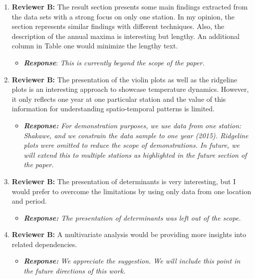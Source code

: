 \documentclass[a4paper, 12pt, conference]{ieeeconf}      %
\begin{document}
\begin{enumerate}
	\item \textbf{Reviewer B:}  The result section presents some main findings extracted from the data sets with a strong focus on only one station. In my opinion, the section represents similar findings with different techniques. Also, the description of the annual maxima is interesting but lengthy.   An additional column in Table one would minimize the lengthy text.
	
		\begin{itemize}
		\item \textbf{\emph{Response}}: \emph{This is currently beyond the scope of the paper.}
	\end{itemize}
	
	 
\item \textbf{Reviewer B:}  The presentation of the violin plots as well as the ridgeline plots is an interesting approach to showcase temperature dynamics. However, it only reflects one year at one particular station and the value of this information for understanding spatio-temporal patterns is limited. 
\begin{itemize}
	\item \emph{\textbf{Response:} For demonstration purposes, we use data from one station: Shakawe, and we constrain the data sample to one year (2015). Ridgeline plots were omitted to reduce the scope of demonstrations. In future, we will extend this to multiple stations as highlighted in the future section of the paper. }
\end{itemize}

\item \textbf{Reviewer B:}  The presentation of determinants is very interesting, but I would prefer to overcome the limitations by using only data from one location and period.

\begin{itemize}
	\item \emph{\textbf{Response:} The presentation of determinants was left out of the scope. }
\end{itemize}

\item \textbf{Reviewer B:}  A multivariate analysis would be providing more insights into related dependencies.
	\begin{itemize}
		\item \emph{\textbf{Response:}} \emph{We appreciate the suggestion. We will include  this point in the future directions of this work.}
	\end{itemize}



\end{enumerate}
\end{document}

